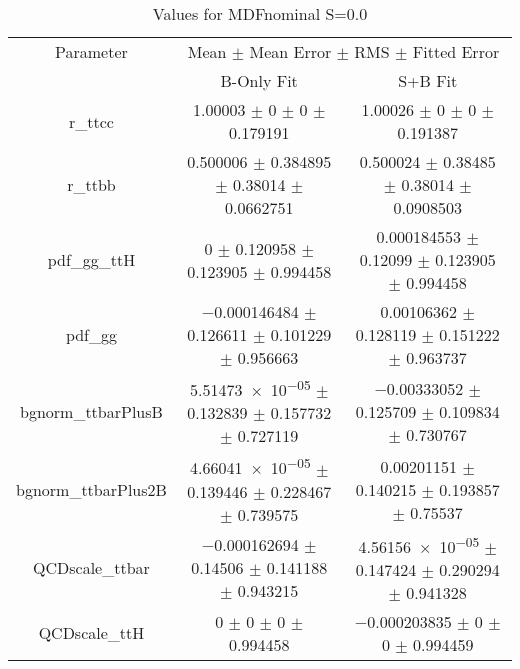 \begin{table}
\centering
\caption{Values for MDFnominal S=0.0}
\begin{tabular}{ccc}
\toprule
Parameter & \multicolumn{2}{c}{Mean $\pm$ Mean Error $\pm$ RMS $\pm$ Fitted Error}\\
 & B-Only Fit & S+B Fit\\
\midrule
r\_ttcc & \num{1.00003} $\pm$ \num{0} $\pm$ \num{0} $\pm$ \num{0.179191} & \num{1.00026} $\pm$ \num{0} $\pm$ \num{0} $\pm$ \num{0.191387}\\
r\_ttbb & \num{0.500006} $\pm$ \num{0.384895} $\pm$ \num{0.38014} $\pm$ \num{0.0662751} & \num{0.500024} $\pm$ \num{0.38485} $\pm$ \num{0.38014} $\pm$ \num{0.0908503}\\
pdf\_gg\_ttH & \num{0} $\pm$ \num{0.120958} $\pm$ \num{0.123905} $\pm$ \num{0.994458} & \num{0.000184553} $\pm$ \num{0.12099} $\pm$ \num{0.123905} $\pm$ \num{0.994458}\\
pdf\_gg & \num{-0.000146484} $\pm$ \num{0.126611} $\pm$ \num{0.101229} $\pm$ \num{0.956663} & \num{0.00106362} $\pm$ \num{0.128119} $\pm$ \num{0.151222} $\pm$ \num{0.963737}\\
bgnorm\_ttbarPlusB & \num{5.51473e-05} $\pm$ \num{0.132839} $\pm$ \num{0.157732} $\pm$ \num{0.727119} & \num{-0.00333052} $\pm$ \num{0.125709} $\pm$ \num{0.109834} $\pm$ \num{0.730767}\\
bgnorm\_ttbarPlus2B & \num{4.66041e-05} $\pm$ \num{0.139446} $\pm$ \num{0.228467} $\pm$ \num{0.739575} & \num{0.00201151} $\pm$ \num{0.140215} $\pm$ \num{0.193857} $\pm$ \num{0.75537}\\
QCDscale\_ttbar & \num{-0.000162694} $\pm$ \num{0.14506} $\pm$ \num{0.141188} $\pm$ \num{0.943215} & \num{4.56156e-05} $\pm$ \num{0.147424} $\pm$ \num{0.290294} $\pm$ \num{0.941328}\\
QCDscale\_ttH & \num{0} $\pm$ \num{0} $\pm$ \num{0} $\pm$ \num{0.994458} & \num{-0.000203835} $\pm$ \num{0} $\pm$ \num{0} $\pm$ \num{0.994459}\\
\bottomrule
\end{tabular}
\end{table}
